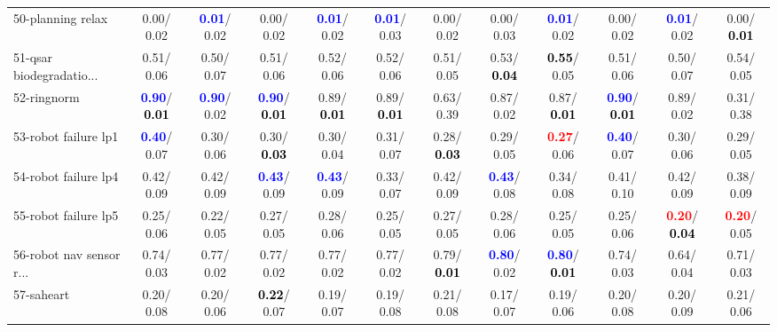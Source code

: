 \begin{table}[h]
\begin{center}
{\begin{tabular}{lc|c|c|c|c|c|c|c|c|c|c}
50-planning relax &   0.00/  0.02 & \textcolor{blue}{\textbf{  0.01}}/  0.02 &   0.00/  0.02 & \textcolor{blue}{\textbf{  0.01}}/  0.02 & \textcolor{blue}{\textbf{  0.01}}/  0.03 &   0.00/  0.02 &   0.00/  0.03 & \textcolor{blue}{\textbf{  0.01}}/  0.02 &   0.00/  0.02 & \textcolor{blue}{\textbf{  0.01}}/  0.02 &   0.00/\textcolor{black}{\textbf{  0.01}} \\
51-qsar biodegradatio... &   0.51/  0.06 &   0.50/  0.07 &   0.51/  0.06 &   0.52/  0.06 &   0.52/  0.06 &   0.51/  0.05 &   0.53/\textcolor{black}{\textbf{  0.04}} & \textcolor{black}{\textbf{  0.55}}/  0.05 &   0.51/  0.06 &   0.50/  0.07 &   0.54/  0.05 \\
52-ringnorm & \textcolor{blue}{\textbf{  0.90}}/\textcolor{black}{\textbf{  0.01}} & \textcolor{blue}{\textbf{  0.90}}/  0.02 & \textcolor{blue}{\textbf{  0.90}}/\textcolor{black}{\textbf{  0.01}} &   0.89/\textcolor{black}{\textbf{  0.01}} &   0.89/\textcolor{black}{\textbf{  0.01}} &   0.63/  0.39 &   0.87/  0.02 &   0.87/\textcolor{black}{\textbf{  0.01}} & \textcolor{blue}{\textbf{  0.90}}/\textcolor{black}{\textbf{  0.01}} &   0.89/  0.02 &   0.31/  0.38 \\
53-robot failure lp1 & \textcolor{blue}{\textbf{  0.40}}/  0.07 &   0.30/  0.06 &   0.30/\textcolor{black}{\textbf{  0.03}} &   0.30/  0.04 &   0.31/  0.07 &   0.28/\textcolor{black}{\textbf{  0.03}} &   0.29/  0.05 & \textcolor{red}{\textbf{  0.27}}/  0.06 & \textcolor{blue}{\textbf{  0.40}}/  0.07 &   0.30/  0.06 &   0.29/  0.05 \\ \hline
54-robot failure lp4 &   0.42/  0.09 &   0.42/  0.09 & \textcolor{blue}{\textbf{  0.43}}/  0.09 & \textcolor{blue}{\textbf{  0.43}}/  0.09 &   0.33/  0.07 &   0.42/  0.09 & \textcolor{blue}{\textbf{  0.43}}/  0.08 &   0.34/  0.08 &   0.41/  0.10 &   0.42/  0.09 &   0.38/  0.09 \\
55-robot failure lp5 &   0.25/  0.06 &   0.22/  0.05 &   0.27/  0.05 &   0.28/  0.06 &   0.25/  0.05 &   0.27/  0.05 &   0.28/  0.06 &   0.25/  0.05 &   0.25/  0.06 & \textcolor{red}{\textbf{  0.20}}/\textcolor{black}{\textbf{  0.04}} & \textcolor{red}{\textbf{  0.20}}/  0.05 \\
56-robot nav sensor r... &   0.74/  0.03 &   0.77/  0.02 &   0.77/  0.02 &   0.77/  0.02 &   0.77/  0.02 &   0.79/\textcolor{black}{\textbf{  0.01}} & \textcolor{blue}{\textbf{  0.80}}/  0.02 & \textcolor{blue}{\textbf{  0.80}}/\textcolor{black}{\textbf{  0.01}} &   0.74/  0.03 &   0.64/  0.04 &   0.71/  0.03 \\
57-saheart &   0.20/  0.08 &   0.20/  0.06 & \textcolor{black}{\textbf{  0.22}}/  0.07 &   0.19/  0.07 &   0.19/  0.08 &   0.21/  0.08 &   0.17/  0.07 &   0.19/  0.06 &   0.20/  0.08 &   0.20/  0.09 &   0.21/  0.06 \\

\end{tabular}}
\end{center}
\end{table}
